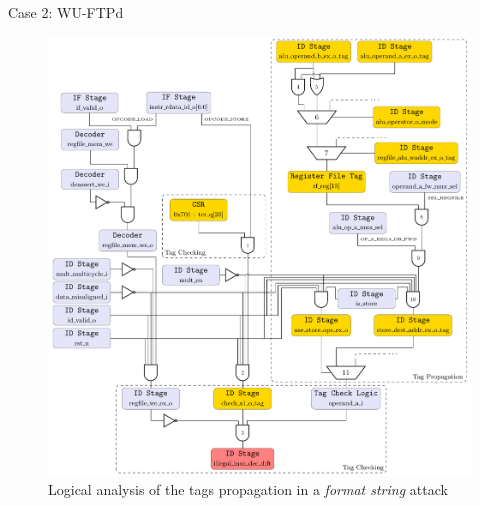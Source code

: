 \begin{frame}[noframenumbering]{Case 2: WU-FTPd}
    \begin{figure}
        \centering
        \includegraphics[height=.8\textheight]{src/2_vuln_assessment/img/wuftpd/arborescence_wuftpd.pdf}
        \caption{Logical analysis of the tags propagation in a \textit{format string} attack}
        \label{fig:analyseLogiqueFormatString}
    \end{figure}
\end{frame}

